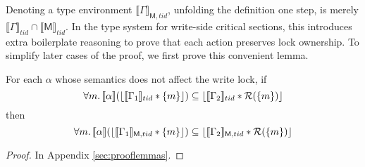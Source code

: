 Denoting a type environment $\llbracket\Gamma\rrbracket_{\mathsf{M},tid}$, unfolding the definition one step, is merely $\llbracket\Gamma\rrbracket_{tid}\cap\llbracket\mathsf{M}\rrbracket_{tid}$.  In the type system for write-side critical sections, this introduces extra boilerplate reasoning to prove that each action preserves lock ownership.  To simplify later cases of the proof, we first prove this convenient lemma.
\begin{lemma}
\label{lem:crit-lifting}
For each $\alpha$ whose semantics does not affect the write lock, if
\[\forall m\ldotp   \llbracket \alpha \rrbracket  (\lfloor \llbracket \Gamma_{1} \rrbracket_{tid}  * \{m\} \rfloor )\subseteq  \lfloor \llbracket \Gamma_{2} \rrbracket_{tid} * \mathcal{R}(\{m\}) \rfloor\]
then
\[\forall m\ldotp   \llbracket \alpha \rrbracket  (\lfloor \llbracket \Gamma_{1} \rrbracket_{\textsf{M},tid}  * \{m\} \rfloor )\subseteq  \lfloor \llbracket \Gamma_{2} \rrbracket_{\textsf{M},tid} * \mathcal{R}(\{m\}) \rfloor\]
\end{lemma}
\begin{proof}
In Appendix \ref{sec:prooflemmas}.
\end{proof}
